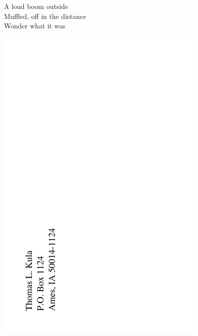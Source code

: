 \documentclass[12pt]{article}
\begin{document}
A loud boom outside \\ 
Muffled, off in the distance \\
Wonder what it was



\newpage

\includegraphics[width=101mm]{backpage.png}
\end{document}

